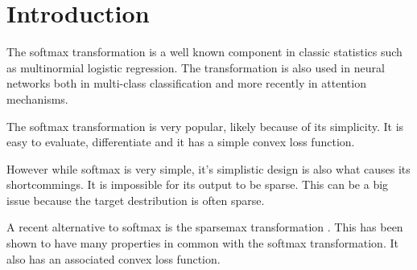\section{Introduction}

The softmax transformation is a well known component in classic statistics such as multinormial logistic regression. The transformation is also used in neural networks both in multi-class classification and more recently in attention mechanisms.

The softmax transformation is very popular, likely because of its simplicity. It is easy to evaluate, differentiate and it has a simple convex loss function.

However while softmax is very simple, it's simplistic design is also what causes its shortcommings. It is impossible for its output to be sparse. This can be a big issue because the target destribution is often sparse.

A recent alternative to softmax is the sparsemax transformation \cite{sparsemax}. This has been shown to have many properties in common with the softmax transformation. It also has an associated convex loss function.
